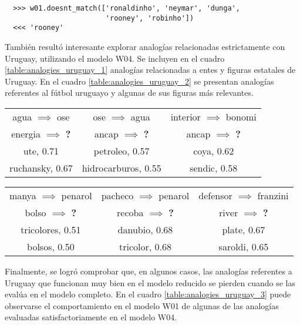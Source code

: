 \begin{lstlisting}
  >>> w01.doesnt_match(['ronaldinho', 'neymar', 'dunga',
                        'rooney', 'robinho'])
  <<< 'rooney'
\end{lstlisting}

También resultó interesante explorar analogías relacionadas estrictamente con Uruguay,
utilizando el modelo W04. Se incluyen en el cuadro \ref{table:analogies_uruguay_1} analogías
relacionadas a entes y figuras estatales de Uruguay. En el cuadro \ref{table:analogies_uruguay_2} se
presentan analogías referentes al fútbol uruguayo y algunas de sus figuras más relevantes.

\begin{table*}[ht]
    \centering
    \begin{tabular}{|c|c|c|}
        \hline
        agua $\implies$ ose & ose $\implies$ agua & interior $\implies$ bonomi\\
        energia $\implies$ \textbf{?} & ancap $\implies$ \textbf{?} & ancap $\implies$ \textbf{?}\\
        \hline
        ute, 0.71 & petroleo, 0.57 & coya, 0.62\\
        ruchansky, 0.67 & hidrocarburos, 0.55 & sendic, 0.58\\
        \hline
    \end{tabular}
    \caption{Analogías relacionadas a entes públicos uruguayos.}
    \label{table:analogies_uruguay_1}
\end{table*}

\begin{table*}[ht]
    \centering
    \begin{tabular}{|c|c|c|}
        \hline
        manya $\implies$ penarol & pacheco $\implies$ penarol & defensor $\implies$ franzini\\
        bolso $\implies$ \textbf{?} & recoba $\implies$ \textbf{?} & river $\implies$ \textbf{?}\\
        \hline
        tricolores, 0.51 & danubio, 0.68 & plate, 0.67\\
        bolsos, 0.50 & tricolor, 0.68 & saroldi, 0.65\\
        \hline
    \end{tabular}
    \caption{Analogías relacionadas al fútbol uruguayo.}
    \label{table:analogies_uruguay_2}
\end{table*}

Finalmente, se logró comprobar que, en algunos casos, las analogías referentes a Uruguay que
funcionan muy bien en el modelo reducido se pierden cuando se las evalúa en el modelo completo. En
el cuadro \ref{table:analogies_uruguay_3} puede observarse el comportamiento en el modelo W01 de
algunas de las analogías evaluadas satisfactoriamente en el modelo W04.

